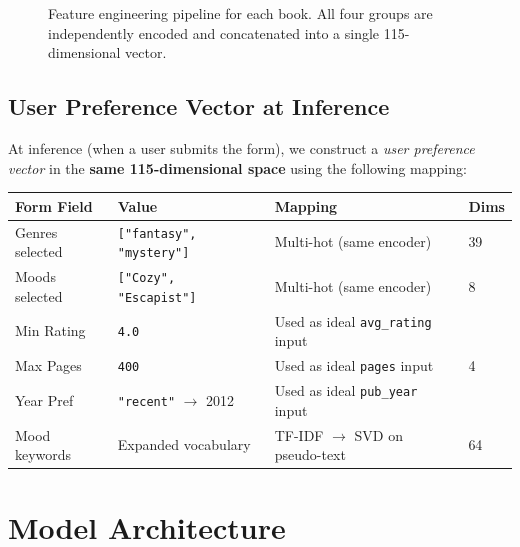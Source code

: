 \documentclass[12pt, a4paper]{article}
\newcommand{\code}[1]{\texttt{\small\color{shelfPurple}#1}}
\begin{document}
\begin{figure}[H]
\caption{Feature engineering pipeline for each book. All four groups are
independently encoded and concatenated into a single 115-dimensional vector.}
\end{figure}

\subsection{User Preference Vector at Inference}

At inference (when a user submits the form), we construct a \emph{user preference
vector} in the \textbf{same 115-dimensional space} using the following mapping:

\begin{center}
\begin{tabular}{@{}llll@{}}
\toprule
\textbf{Form Field} & \textbf{Value} & \textbf{Mapping} & \textbf{Dims} \\
\midrule
Genres selected & \code{["fantasy", "mystery"]} & Multi-hot (same encoder) & 39 \\
Moods selected & \code{["Cozy", "Escapist"]} & Multi-hot (same encoder) & 8 \\
Min Rating & \code{4.0} & Used as ideal \code{avg\_rating} input & \multirow{3}{*}{4} \\
Max Pages & \code{400} & Used as ideal \code{pages} input & \\
Year Pref & \code{"recent"} $\to$ 2012 & Used as ideal \code{pub\_year} input & \\
Mood keywords & Expanded vocabulary & TF-IDF $\to$ SVD on pseudo-text & 64 \\
\bottomrule
\end{tabular}
\end{center}

\section{Model Architecture}
\end{document}
